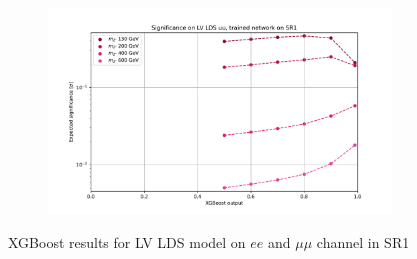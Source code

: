 \documentclass[12pt, a4paper]{book}
\begin{document}
\begin{figure}[!ht]
\begin{subfigure}[b]{0.49\textwidth}
   \end{subfigure}
   \hfill
   \begin{subfigure}[b]{0.49\textwidth}
      \centering
      \includegraphics[width=1\textwidth]{XGBoost/Model_independent/50-100/LV_LDS/EXP_SIG_uu.pdf}
   \end{subfigure}
   \caption{XGBoost results for LV LDS model on $ee$ and $\mu\mu$ channel in SR1}\label{fig:LV_LDS_SR1}
\end{figure}
\end{document}
